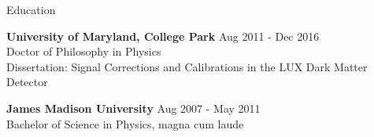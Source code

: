 \documentclass{resume} %
\begin{document}

\begin{rSection}{Education}

\hspace{-1em} {\bf University of Maryland, College Park} \hfill {Aug 2011 - Dec 2016} \\ 
Doctor of Philosophy in Physics \\
Dissertation: Signal Corrections and Calibrations in the LUX Dark Matter Detector

\hspace{-1em} {\bf James Madison University} \hfill {Aug 2007 - May 2011} \\ 
Bachelor of Science in Physics, magna cum laude \\

\vspace{-1em}

\end{rSection}

\end{document}
